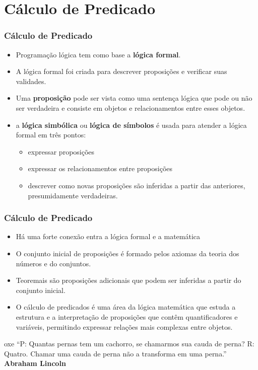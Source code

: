 \section{Cálculo de Predicado}
\begin{frame}
	\frametitle{Cálculo de Predicado}
	\begin{itemize}
		\item Programação lógica tem como base a \textbf{lógica formal}.
		\item A lógica formal foi criada para descrever proposições e verificar suas validades.
		\item Uma \textbf{proposição} pode ser vista como uma sentença lógica que pode 
		ou não ser verdadeira e consiste em objetos e relacionamentos entre esses objetos.
		\item a \textbf{lógica simbólica} ou \textbf{lógica de símbolos} é usada para atender a lógica formal em três pontos:
		
		\begin{itemize}
			\item expressar proposições
			\item expressar os relacionamentos entre proposições
			\item descrever como novas proposições são inferidas a partir das anteriores, presumidamente verdadeiras.
		\end{itemize}
	\end{itemize}
\end{frame}



\begin{frame}
	\frametitle{Cálculo de Predicado}
	\begin{itemize}
		\item Há uma forte conexão entra a lógica formal e a matemática 
		\item O conjunto inicial de proposições é formado pelos axiomas da teoria dos números e do conjuntos. 
		\item Teoremais são proposições adicionais que podem ser inferidas a partir do conjunto inicial.
		\item O cálculo de predicados é uma área da lógica matemática que estuda a estrutura e a interpretação de proposições que contêm quantificadores e variáveis, permitindo expressar relações mais complexas entre objetos.
	\end{itemize}

	\begin{block}{oxe}
		``P: Quantas pernas tem um cachorro, se chamarmos sua cauda de perna?
R: Quatro. Chamar uma cauda de perna não a transforma em uma perna.''
		\textbf{Abraham Lincoln}
	\end{block}
\end{frame}